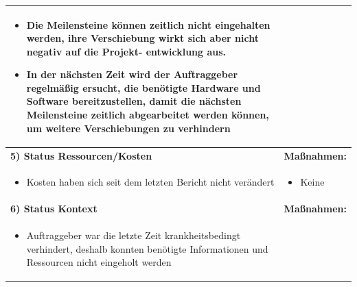 \begin{center}
\begin{scriptsize}
\begin{tabularx}{\textwidth}{|p{8cm}|X|}
\begin{minipage}{.4\textwidth}
\begin{flushleft}
\begin{itemize}
         \item Die Meilensteine können zeitlich nicht eingehalten werden, ihre Verschiebung wirkt sich aber nicht negativ auf die Projekt- entwicklung aus.
         \item In der nächsten Zeit wird der Auftraggeber regelmäßig ersucht, die benötigte Hardware und Software bereitzustellen, damit die nächsten Meilensteine zeitlich abgearbeitet werden können, um weitere Verschiebungen zu verhindern
         \vspace{0.2cm}
    \end{itemize}
    \end{flushleft}
    \end{minipage} \\
    \hline
    \textbf{5) Status Ressourcen/Kosten} & \textbf{Maßnahmen:}\\
    \begin{minipage}{.58\textwidth} 
    \begin{flushleft}
        \begin{itemize} \vspace{0cm}  
         \item Kosten haben sich seit dem letzten Bericht nicht verändert
         \vspace{0.2cm}
    \end{itemize}
    \end{flushleft}
    \end{minipage} &
    \begin{minipage}{.4\textwidth} 
    \begin{flushleft}
        \begin{itemize} %
         \item Keine
         \vspace{0.2cm}
    \end{itemize}
    \end{flushleft}
    \end{minipage} \\
    \hline
    \textbf{6) Status Kontext} & \textbf{Maßnahmen:}\\
    \begin{minipage}{.555\textwidth} 
    \begin{flushleft}
        \begin{itemize} \vspace{0cm}  
            \item Auftraggeber war die letzte Zeit krankheitsbedingt verhindert, deshalb konnten benötigte Informationen und Ressourcen nicht eingeholt werden

\end{itemize}
\end{flushleft}
\end{minipage}
\end{tabularx}
\end{scriptsize}
\end{center}
